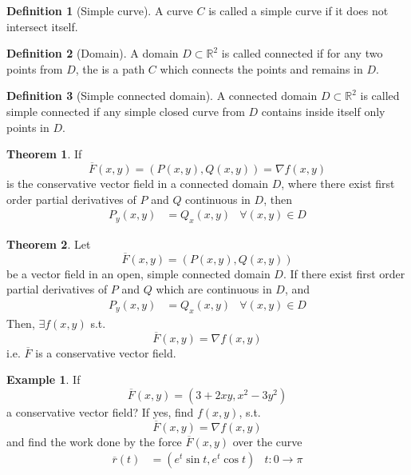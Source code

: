 \documentclass[fleqn, a4paper, 10pt]{article}
\theoremstyle{definition}
\newtheorem{example}{Example}
\newtheorem{definition}{Definition}
\theoremstyle{theorem}
\newtheorem{theorem}{Theorem}
\theoremstyle{remark}
\begin{document}
\begin{multicols}{2}
\begin{definition}[Simple curve]
A curve $C$ is called a simple curve if it does not intersect itself.
\end{definition}

\begin{definition}[Domain]
	A domain $D \subset \mathbb{R}^2$ is called connected if for any two points from $D$, the is a path $C$ which connects the points and remains in $D$.
\end{definition}

\begin{definition}[Simple connected domain]
	A connected domain $D \subset \mathbb{R}^2$ is called simple connected if any simple closed curve from $D$ contains inside itself only points in $D$.
\end{definition}

\begin{theorem}
	If
	\begin{equation*}
		\overline{F}(x,y) = \left( P(x,y), Q(x,y) \right) = \nabla f(x,y)
	\end{equation*}
	is the conservative vector field in a connected domain $D$, where there exist first order partial derivatives of $P$ and $Q$ continuous in $D$, then
	\begin{align*}
		P_y(x,y) &= Q_x(x,y) &\forall (x,y) \in D
	\end{align*}
\end{theorem}

\begin{theorem}
	Let
	\begin{equation*}
	\overline{F}(x,y) = \left( P(x,y), Q(x,y) \right)
	\end{equation*}
	be a vector field in an open, simple connected domain $D$. If there exist first order partial derivatives of $P$ and $Q$ which are continuous in $D$, and
	\begin{align*}
		P_y(x,y) &= Q_x(x,y) &\forall (x,y) \in D
	\end{align*}
	Then, $\exists f(x,y)$ s.t.
	\begin{equation*}
		\overline{F}(x,y) = \nabla f(x,y)
	\end{equation*}
	i.e. $\overline{F}$ is a conservative vector field.
\end{theorem}

\begin{example}
	If 
	\begin{equation*}
		\overline{F}(x,y) = (3 + 2 x y, x^2 - 3 y^2)
	\end{equation*}
	a conservative vector field? If yes, find $f(x,y)$, s.t.
	\begin{equation*}
		\overline{F}(x,y) = \nabla f(x,y)
	\end{equation*}
	and find the work done by the force $\overline{F}(x,y)$ over the curve
	\begin{align*}
		\overline{r}(t) &= (e^t \sin t, e^t \cos t) & t : 0 \to \pi
	\end{align*}
\end{example}


\end{multicols}
\end{document}
